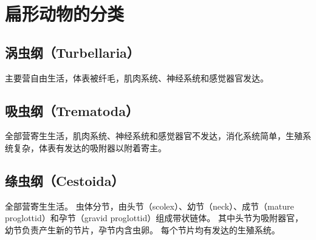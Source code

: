 \documentclass[11pt]{article}
\begin{document}
\section{扁形动物的分类}
\subsection{涡虫纲（Turbellaria）}
主要营自由生活，体表被纤毛，肌肉系统、神经系统和感觉器官发达。

\subsection{吸虫纲（Trematoda）}
全部营寄生生活，肌肉系统、神经系统和感觉器官不发达，消化系统简单，生殖系统复杂，体表有发达的吸附器以附着寄主。

\subsection{绦虫纲（Cestoida）}
全部营寄生生活。
虫体分节，由头节（scolex）、幼节（neck）、成节（mature proglottid）和孕节（gravid proglottid）组成带状链体。
其中头节为吸附器官，幼节负责产生新的节片，孕节内含虫卵。
每个节片均有发达的生殖系统。
\end{document}
